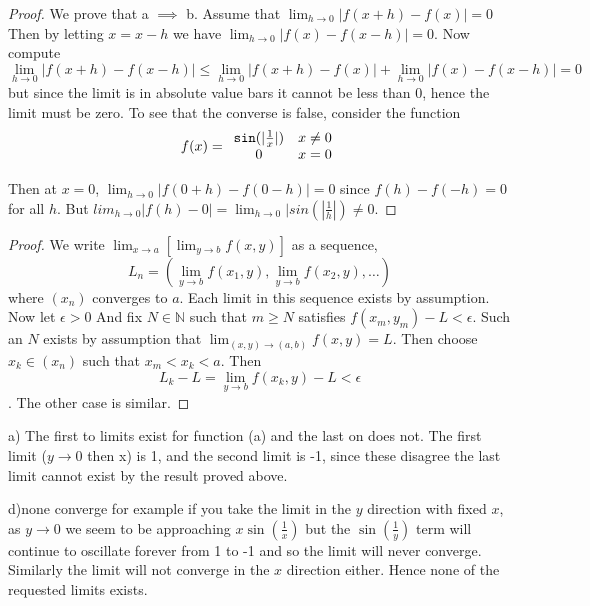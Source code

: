 \documentclass[11pt,largemargins]{homework}
\newcommand{\N}{\mathbb{N}}
\begin{document}
    \begin{proof}
        We prove that a $\implies$ b. Assume that $\lim_{h \to 0} |f(x + h) - f(x)| = 0$ Then by letting $x = x -h $
        we have $\lim_{h \to 0}|f(x) - f(x - h)| = 0$. Now compute 
        \[\lim_{h \to 0 } |f(x + h) - f(x - h)| \leq \lim_{h \to 0} |f(x + h) - f(x)| + \lim_{h \to 0} |f(x) - f(x - h)| = 0\]
        but since the limit is in absolute value bars it cannot be less than $0$, hence the limit must be zero. 
        To see that the converse is false, consider the function 
        \begin{equation}
            f(x) = 
            \begin{array}{cc}
                {\tt sin}(|\frac{1}{x}|) & x \neq 0 \\
                0 & x = 0
            \end{array}
        \end{equation}

        Then at $x = 0$, $\lim_{h \to 0}|f(0 + h) - f(0-h)| = 0$ since $f(h)  - f(-h) = 0$ for all $h$. But 
        $lim_{h \to 0} |f(h) - 0| = \lim_{h \to 0}|sin(|\frac{1}{h}|) \neq 0$. 


    \end{proof}

    \question

    \begin{proof}
       We write $\lim_{x \to a}[\lim_{y \to b}f(x, y)]$ as a sequence, 
       \[L_n = (\lim_{y \to b}f(x_1, y), \lim_{y \to b}f(x_2, y), \dots )\]
       where $(x_n)$ converges to $a$. Each limit in this sequence exists by assumption. 
       Now let $\epsilon > 0$ And fix $N \in \N$ such that $m \geq N$ satisfies
       $f(x_m, y_m) - L < \epsilon$. Such an $N$ exists by assumption that $\lim_{(x, y) \to (a, b)} f(x, y) = L.$
        Then choose $x_k \in (x_n)$ such that $x_m < x_k < a$. Then 
        \[L_k - L =  \lim_{y \to b}f(x_k, y) - L < \epsilon\]. The other case is similar. 

    \end{proof}

    a) 
    The first to limits exist for function (a) and the last on does not. 
    The first limit ($y \to 0$ then x) is 1, and the second limit is -1, since these disagree the last limit cannot exist by 
    the result proved above. 

    d)none converge for example if you take the limit in the $y$ direction with fixed $x$, as $y \to 0$ we seem to be approaching $x \sin(\frac{1}{x})$ but the $\sin(\frac{1}{y})$ term 
    will continue to oscillate forever from 1 to -1 and so the limit will never converge. Similarly the limit will not converge in the $x$ direction either. Hence none of the requested limits exists. 
\end{document}
